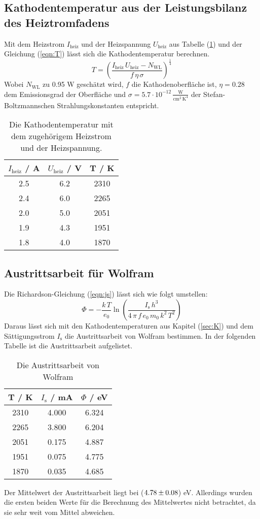 \subsection{Kathodentemperatur aus der Leistungsbilanz des Heiztromfadens}
\label{sec:L}
Mit dem Heizstrom $I_\text{heiz}$ und der Heizspannung $U_\text{heiz}$ aus Tabelle (\ref{tab:heiz}) und der Gleichung (\ref{eqn:T}) lässt sich die Kathodentemperatur berechnen.
\begin{equation}
  T = \left(\frac{I_\text{heiz}\, U_\text{heiz} - N_\text{WL}}{f\, \eta\, \sigma}\right)^{\frac{1}{4}}
  \label{eqn:T}
\end{equation}
Wobei $N_\text{WL}$ zu 0.95 W geschätzt wird, $f$ die Kathodenoberfläche ist, $\eta = 0.28$ dem Emissionsgrad der Oberfläche und $\sigma = 5.7 \cdot 10^{-12} \, \frac{\text{W}}{\text{cm}^2\, \text{K}^4}$ der Stefan-Boltzmannschen Strahlungskonstanten entspricht.

\begin{table}[H]
  \centering
  \begin{tabular}{c c c}
    \toprule
    $I_\text{heiz}$ / A & $U_\text{heiz}$ / V & T / K \\
    \midrule
    2.5 & 6.2 & 2310 \\
    2.4 & 6.0 & 2265 \\
    2.0 & 5.0 & 2051 \\
    1.9 & 4.3 & 1951 \\
    1.8 & 4.0 & 1870 \\
    \bottomrule
  \end{tabular}
  \caption{Die Kathodentemperatur mit dem zugehörigem Heizstrom und der Heizspannung.}
  \label{tab:heiz}
\end{table}

\subsection{Austrittsarbeit für Wolfram}
Die Richardson-Gleichung (\ref{eqn:js}) lässt sich wie folgt umstellen:
\begin{equation}
  \Phi = - \frac{k\, T}{e_0} \ln \left(\frac{I_\text{s}\, h^3}{4\, \pi\, f\, e_0\, m_0\, k^2\, T^2}\right)
\end{equation}
Daraus lässt sich mit den Kathodentemperaturen aus Kapitel (\ref{sec:K}) und dem Sättigungsstrom $I_\text{s}$ die Austrittsarbeit von Wolfram bestimmen. In der folgenden Tabelle ist die Austrittsarbeit aufgelistet.

\begin{table}[H]
  \centering
  \begin{tabular}{c c c}
    \toprule
    T / K & $I_\text{s}$ / mA & $\Phi$ / eV \\
    \midrule
    2310 & 4.000 & 6.324 \\
    2265 & 3.800 & 6.204 \\
    2051 & 0.175 & 4.887 \\
    1951 & 0.075 & 4.775 \\
    1870 & 0.035 & 4.685 \\
    \bottomrule
  \end{tabular}
  \caption{Die Austrittsarbeit von Wolfram}
  \label{tab:}
\end{table}

Der Mittelwert der Austrittsarbeit liegt bei ($\num{4.78 +- 0.08}$) eV. Allerdings wurden die ersten beiden Werte für die Berechnung des Mittelwertes nicht betrachtet, da sie sehr weit vom Mittel abweichen.
